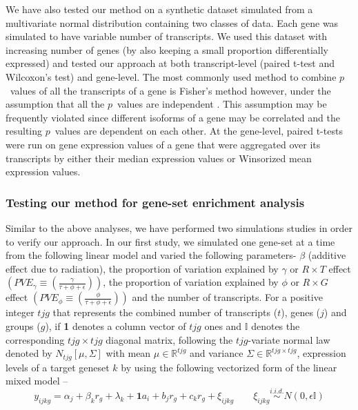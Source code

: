 \documentclass[hidelinks,11pt]{article}
\begin{document}
We have also tested our method on a synthetic dataset simulated from a multivariate normal distribution containing two classes of data. Each gene was simulated to have variable number of transcripts. We used this dataset with increasing number of genes (by also keeping a small proportion differentially expressed) and tested our approach at both transcript-level (paired t-test and Wilcoxon's test) and gene-level. The most commonly used method to combine $p$~values of all the transcripts of a gene is Fisher's method however, under the assumption that all the $p$~values are independent \cite{fisher}. This assumption may be frequently violated since different isoforms of a gene may be correlated and the resulting $p$~values are dependent on each other. At the gene-level, paired t-tests were run on gene expression values of a gene that were aggregated over its transcripts by either their median expression values or Winsorized mean \cite{winsor} expression values.

\subsubsection*{Testing our method for gene-set enrichment analysis}

Similar to the above analyses, we have performed two simulations studies in order to verify our approach. In our first study, we simulated one gene-set at a time from the following linear model and varied the following parameters- $\beta$ (additive effect due to radiation), the proportion of variation explained by $\gamma$ or $R \times T$ effect $\left( PVE_{\gamma} \equiv \left(\frac{\gamma}{\tau + \phi + \epsilon}\right) \right)$, the proportion of variation explained by $\phi$ or $R \times G$ effect  $\left( PVE_{\phi} \equiv \left(\frac{\phi}{\tau + \phi + \epsilon}\right) \right)$ and the number of transcripts. For a positive integer $tjg$ that represents the combined number of transcripts ($t$), genes ($j$) and groups ($g$), if \textbf{1} denotes a column vector of $tjg$ ones and $\mathbb{I}$ denotes the corresponding $tjg \times tjg$ diagonal matrix, following the $tjg$-variate normal law denoted by $N_{tjg}\left[\mu,\Sigma\right]$ with mean $\mu \in \mathbb{R}^{tjg}$ and variance $\Sigma \in \mathbb{R}^{tjg \times tjg}$, expression levels of a target geneset $k$ by using the following vectorized form of the linear mixed model --
\begin{equation}
y_{ijkg} = \alpha_{j} + \beta_{k} r_{g} + \lambda_{k} + \textbf{1} a_i + b_{j} r_{g} +  c_{k} r_{g} + \xi_{ijkg} \qquad \xi_{ijkg}  \overset{i.i.d.} \sim N \left( 0, \epsilon\mathbb{I} \right)
\end{equation}
\end{document}
